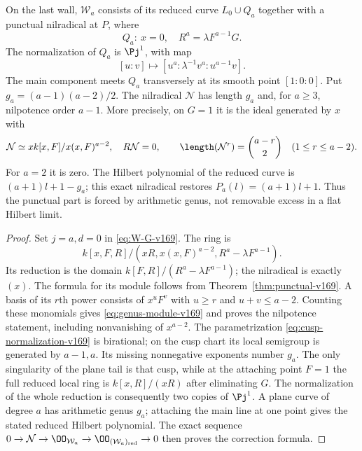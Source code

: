 \begin{theorem}\label{thm:genus-correction-v169}
On the last wall, $\mathcal W_a$ consists of its reduced curve
$L_0\cup Q_a$ together with a punctual nilradical at $P$, where
\[
 Q_a:\ x=0,\quad R^a=\lambda F^{a-1}G.
\]
The normalization of $Q_a$ is $\Pj^1$, with map
\begin{equation}\label{eq:cusp-normalization-v169}
 [u:v]\longmapsto[u^a:\lambda^{-1}v^a:u^{a-1}v].
\end{equation}
The main component meets $Q_a$ transversely at its smooth point
$[1:0:0]$. Put $g_a=(a-1)(a-2)/2$. The nilradical $\mathcal N$ has
length $g_a$ and, for $a\geq3$, nilpotence order $a-1$. More precisely,
on $G=1$ it is the ideal generated by $x$ with
\begin{equation}\label{eq:genus-module-v169}
 \mathcal N\simeq xk[x,F]/x(x,F)^{a-2},\quad R\mathcal N=0,
 \qquad
 \length(\mathcal N^r)=\binom{a-r}{2}\quad(1\leq r\leq a-2).
\end{equation}
For $a=2$ it is zero. The Hilbert polynomial of the reduced curve is
$(a+1)l+1-g_a$; this exact nilradical restores $P_a(l)=(a+1)l+1$.
Thus the punctual part is forced by arithmetic genus, not removable
excess in a flat Hilbert limit.
\end{theorem}
\begin{proof}
Set $j=a,d=0$ in \eqref{eq:W-G-v169}. The ring is
\[
 k[x,F,R]/(xR,x(x,F)^{a-2},R^a-\lambda F^{a-1}).
\]
Its reduction is the domain $k[F,R]/(R^a-\lambda F^{a-1})$; the
nilradical is exactly $(x)$. The formula for its module follows from
Theorem~\ref{thm:punctual-v169}. A basis of its $r$th power consists
of $x^uF^v$ with $u\geq r$ and $u+v\leq a-2$. Counting these
monomials gives \eqref{eq:genus-module-v169} and proves the
nilpotence statement, including nonvanishing of $x^{a-2}$.
The parametrization \eqref{eq:cusp-normalization-v169} is birational;
on the cusp chart its local semigroup is generated by $a-1,a$.
Its missing nonnegative exponents number $g_a$. The only singularity
of the plane tail is that cusp, while at the attaching point $F=1$
the full reduced local ring is $k[x,R]/(xR)$ after eliminating $G$.
The normalization of the whole reduction is consequently two copies
of $\Pj^1$. A plane curve of degree $a$ has arithmetic genus $g_a$;
attaching the main line at one point gives the stated reduced Hilbert
polynomial. The exact sequence
$0\to\mathcal N\to\OO_{\mathcal W_a}\to\OO_{(\mathcal W_a)_{\rm red}}\to0$
then proves the correction formula.
\end{proof}

